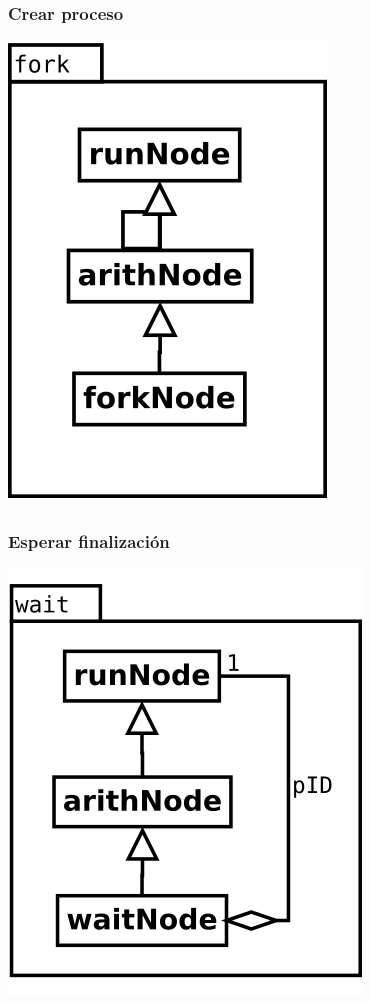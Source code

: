 \begin{multicols}{2}
   \subsubsection {Crear proceso} 
   \begin{center}
   \includegraphics[scale=0.4]{fork.png} \\
   \end{center}
\columnbreak
   \subsubsection {Esperar finalización} 
   \begin{center}
   \includegraphics[scale=0.4]{wait.png} \\
   \end{center}
\end{multicols}


